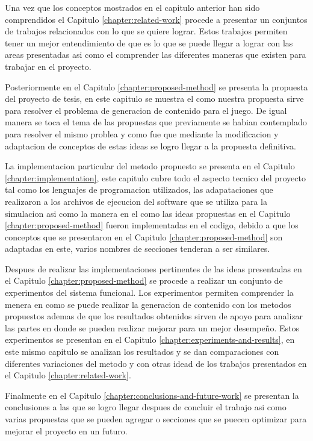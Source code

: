 Una vez que los conceptos mostrados en el capitulo anterior han sido
comprendidos el Capitulo \ref{chapter:related-work} procede a presentar un
conjuntos de trabajos relacionados con lo que se quiere lograr. Estos trabajos
permiten tener un mejor entendimiento de que es lo que se puede llegar a lograr
con las areas presentadas asi como el comprender las diferentes maneras que
existen para trabajar en el proyecto.

Posteriormente en el Capitulo \ref{chapter:proposed-method} se presenta la
propuesta del proyecto de tesis, en este capitulo se muestra el como nuestra
propuesta sirve para resolver el problema de generacion de contenido para el
juego. De igual manera se toca el tema de las propuestas que previamente se
habian contemplado para resolver el mismo problea y como fue que mediante la
modificacion y adaptacion de conceptos de estas ideas se logro llegar a la
propuesta definitiva.

La implementacion particular del metodo propuesto se presenta en el Capitulo
\ref{chapter:implementation}, este capitulo cubre todo el aspecto tecnico del
proyecto tal como los lenguajes de programacion utilizados, las adapataciones
que realizaron a los archivos de ejecucion del software que se utiliza para la
simulacion asi como la manera en el como las ideas propuestas en el Capitulo
\ref{chapter:proposed-method} fueron implementadas en el codigo, debido a que
los conceptos que se presentaron en el Capitulo \ref{chapter:proposed-method}
son adaptadas en este, varios nombres de secciones tenderan a ser similares.

Despues de realizar las implementaciones pertinentes de las ideas presentadas en
el Capitulo \ref{chapter:proposed-method} se procede a realizar un conjunto de
experimentos del sistema funcional. Los experimentos permiten comprender la
menera en como se puede realizar la generacion de contenido con los metodos
propuestos ademas de que los resultados obtenidos sirven de apoyo para analizar
las partes en donde se pueden realizar mejorar para un mejor desempeño. Estos
experimentos se presentan en el Capitulo \ref{chapter:experiments-and-results},
en este mismo capitulo se analizan los resultados y se dan comparaciones con
diferentes variaciones del metodo y con otras idead de los trabajos presentados
en el Capitulo \ref{chapter:related-work}.

Finalmente en el Capitulo \ref{chapter:conclusions-and-future-work} se presentan
la conclusiones a las que se logro llegar despues de concluir el trabajo asi
como varias propuestas que se pueden agregar o secciones que se puecen optimizar
para mejorar el proyecto en un futuro.

